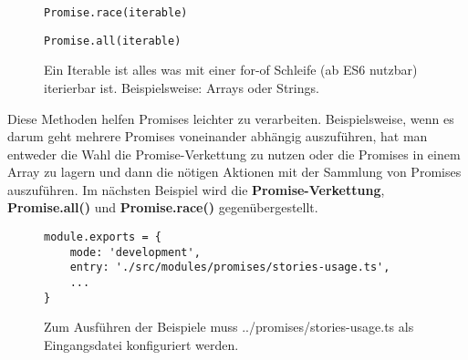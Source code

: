 \begin{description}

\begin{figure}[H]
\item \begin{lstlisting}[basicstyle=\small]
Promise.race(iterable)
\end{lstlisting}

\item \begin{lstlisting}[basicstyle=\small]
Promise.all(iterable)
\end{lstlisting}
\caption{Ein Iterable ist alles was mit einer for-of Schleife (ab ES6 nutzbar) iterierbar ist. Beispielsweise: Arrays oder Strings.}
\end{figure}
\end{description}

\noindent
Diese Methoden helfen Promises leichter zu verarbeiten. Beispielsweise, wenn es darum geht mehrere Promises voneinander abhängig auszuführen, hat man entweder die Wahl die Promise-Verkettung zu nutzen oder die Promises in einem Array zu lagern und dann die nötigen Aktionen mit der Sammlung von Promises auszuführen. Im nächsten Beispiel wird die \textbf{Promise-Verkettung}, \textbf{Promise.all()} und \textbf{Promise.race()} gegenübergestellt.

\begin{figure}[H]
\begin{lstlisting}[basicstyle=\small]
module.exports = {
    mode: 'development',
    entry: './src/modules/promises/stories-usage.ts',
    ...
}
\end{lstlisting}
\caption{Zum Ausführen der Beispiele muss ../promises/stories-usage.ts als Eingangsdatei konfiguriert werden.}
\end{figure}

